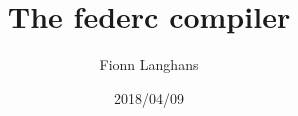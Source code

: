 \documentclass[11pt,a4paper]{report}
\date{2018/04/09}
\author{Fionn Langhans}
\title{\Huge \textbf{The federc compiler}}
\begin{document}
\begin{titlepage}
\maketitle
\end{titlepage}

\tableofcontents




\end{document}
